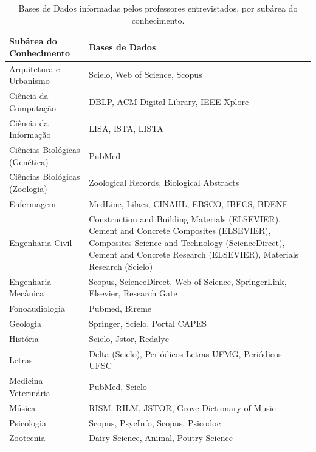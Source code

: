 \begin{table}[h!]
    \caption{Bases de Dados informadas pelos professores entrevistados, por subárea do conhecimento.}
    \begin{center}
        \begin{tabular}{|p{6cm}|p{8cm}|}
            \hline 
            \textbf{Subárea do Conhecimento} & \textbf{Bases de Dados} \\ 
            \hline 
            Arquitetura e Urbanismo & Scielo, Web of Science, Scopus \\
            \hline
            Ciência da Computação & DBLP, ACM Digital Library, IEEE Xplore \\
            \hline
            Ciência da Informação & LISA, ISTA, LISTA \\
            \hline
            Ciências Biológicas (Genética) & PubMed \\
            \hline
            Ciências Biológicas (Zoologia) & Zoological Records, Biological Abstracts \\
            \hline
            Enfermagem & MedLine, Lilacs, CINAHL, EBSCO, IBECS, BDENF \\
            \hline
            Engenharia Civil & Construction and Building Materials (ELSEVIER), Cement and Concrete Composites (ELSEVIER), Composites Science and Technology (ScienceDirect), Cement and Concrete Research (ELSEVIER), Materials Research (Scielo) \\
            \hline
            Engenharia Mecânica & Scopus, ScienceDirect, Web of Science, SpringerLink, Elsevier, Research Gate \\
            \hline
            Fonoaudiologia & Pubmed, Bireme \\
            \hline
            Geologia & Springer, Scielo, Portal CAPES \\
            \hline
            História & Scielo, Jstor, Redalyc \\
            \hline
            Letras & Delta (Scielo), Periódicos Letras UFMG, Periódicos UFSC \\
            \hline
            Medicina Veterinária & PubMed, Scielo \\
            \hline
            Música & RISM, RILM, JSTOR, Grove Dictionary of Music \\
            \hline
            Psicologia & Scopus, PsycInfo, Scopus, Psicodoc \\
            \hline
            Zootecnia & Dairy Science, Animal, Poutry Science \\
            \hline
        \end{tabular}
    \end{center}
    \label{tab:databases}
\end{table}

